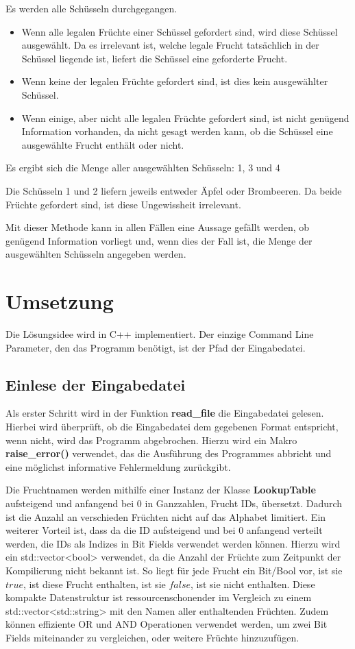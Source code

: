 \documentclass[a4paper,10pt,ngerman]{scrartcl}
\begin{document}
Es werden alle Schüsseln durchgegangen.
\begin{itemize}
    \item Wenn alle legalen Früchte einer Schüssel gefordert sind, wird diese Schüssel ausgewählt.
          Da es irrelevant ist, welche legale Frucht tatsächlich in der Schüssel liegende ist, liefert die Schüssel eine geforderte Frucht.
    \item Wenn keine der legalen Früchte gefordert sind, ist dies kein ausgewählter Schüssel.
    \item Wenn einige, aber nicht alle legalen Früchte gefordert sind, ist nicht genügend Information vorhanden, da nicht gesagt werden kann, ob die Schüssel eine ausgewählte Frucht enthält oder nicht.
\end{itemize}
Es ergibt sich die Menge aller ausgewählten Schüsseln: 1, 3 und 4

Die Schüsseln 1 und 2 liefern jeweils entweder Äpfel oder Brombeeren.
Da beide Früchte gefordert sind, ist diese Ungewissheit irrelevant.

Mit dieser Methode kann in allen Fällen eine Aussage gefällt werden, ob genügend Information vorliegt und, wenn dies der Fall ist, die Menge der ausgewählten Schüsseln angegeben werden.

\section{Umsetzung}
Die Lösungsidee wird in C++ implementiert.
Der einzige Command Line Parameter, den das Programm benötigt, ist der Pfad der Eingabedatei.

\subsection{Einlese der Eingabedatei}
Als erster Schritt wird in der Funktion \textbf{read\_file} die Eingabedatei gelesen.
Hierbei wird überprüft, ob die Eingabedatei dem gegebenen Format entspricht, wenn nicht, wird das Programm abgebrochen.
Hierzu wird ein Makro \textbf{raise\_error()} verwendet, das die Ausführung des Programmes abbricht und eine möglichst informative Fehlermeldung zurückgibt.

Die Fruchtnamen werden mithilfe einer Instanz der Klasse \textbf{LookupTable} aufsteigend und anfangend bei $0$ in Ganzzahlen, Frucht IDs, übersetzt.
Dadurch ist die Anzahl an verschieden Früchten nicht auf das Alphabet limitiert.
Ein weiterer Vorteil ist, dass da die ID aufsteigend und bei $0$ anfangend verteilt werden, die IDs als Indizes in Bit Fields verwendet werden können.
Hierzu wird ein std::vector<bool> verwendet, da die Anzahl der Früchte zum Zeitpunkt der Kompilierung nicht bekannt ist.
So liegt für jede Frucht ein Bit/Bool vor, ist sie $true$, ist diese Frucht enthalten, ist sie $false$, ist sie nicht enthalten.
Diese kompakte Datenstruktur ist ressourcenschonender im Vergleich zu einem std::vector<std::string> mit den Namen aller enthaltenden Früchten.
Zudem können effiziente OR und AND Operationen verwendet werden, um zwei Bit Fields miteinander zu vergleichen, oder weitere Früchte hinzuzufügen.
\end{document}
